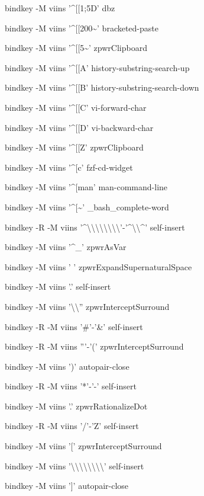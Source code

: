 \documentclass[11pt,a4paper,twoside]{book}
\begin{document}
bindkey -M viins '\textasciicircum{}[[1;5D' dbz

bindkey -M viins '\textasciicircum{}[[200\textasciitilde{}' bracketed-paste

bindkey -M viins '\textasciicircum{}[[5\textasciitilde{}' zpwrClipboard

bindkey -M viins '\textasciicircum{}[[A' history-substring-search-up

bindkey -M viins '\textasciicircum{}[[B' history-substring-search-down

bindkey -M viins '\textasciicircum{}[[C' vi-forward-char

bindkey -M viins '\textasciicircum{}[[D' vi-backward-char

bindkey -M viins '\textasciicircum{}[[Z' zpwrClipboard

bindkey -M viins '\textasciicircum{}[c' fzf-cd-widget

bindkey -M viins '\textasciicircum{}[man' man-command-line

bindkey -M viins '\textasciicircum{}[\textasciitilde{}' \_bash\_complete-word

bindkey -R -M viins '\textasciicircum{}\textbackslash{}\textbackslash{}\textbackslash{}\textbackslash{}\textbackslash{}\textbackslash{}\textbackslash{}\textbackslash{}'-'\textasciicircum{}\textbackslash{}\textbackslash{}\textasciicircum{}' self-insert

bindkey -M viins '\textasciicircum{}\_' zpwrAsVar

bindkey -M viins ' ' zpwrExpandSupernaturalSpace

bindkey -M viins '.' self-insert

bindkey -M viins '\textbackslash{}\textbackslash{}'' zpwrInterceptSurround

bindkey -R -M viins '\#'-'\&' self-insert

bindkey -R -M viins '''-'(' zpwrInterceptSurround

bindkey -M viins ')' autopair-close

bindkey -R -M viins '*'-'-' self-insert

bindkey -M viins '.' zpwrRationalizeDot

bindkey -R -M viins '/'-'Z' self-insert

bindkey -M viins '[' zpwrInterceptSurround

bindkey -M viins '\textbackslash{}\textbackslash{}\textbackslash{}\textbackslash{}\textbackslash{}\textbackslash{}\textbackslash{}\textbackslash{}' self-insert

bindkey -M viins ']' autopair-close
\end{document}
